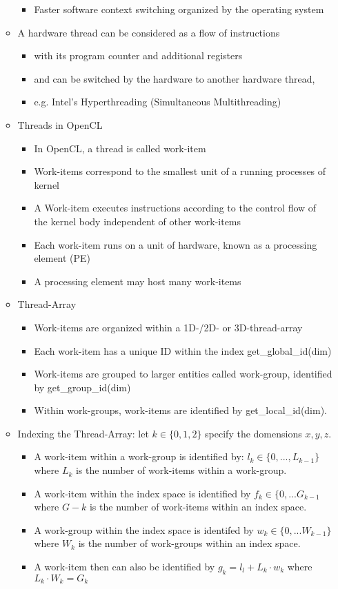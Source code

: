 \documentclass[paper=a4, fontsize=11pt]{scrartcl} %
\numberwithin{equation}{section} %
\numberwithin{figure}{section} %
\numberwithin{table}{section} %
\begin{document}
\begin{itemize}
\begin{itemize}
\begin{itemize}
      \item Faster software context switching organized by the operating system
    \end{itemize}
    \item A hardware thread can be considered as a flow of instructions
    \begin{itemize}
      \item with its program counter and additional registers
      \item and can be switched by the hardware to another hardware thread,
      \item e.g. Intel's Hyperthreading (Simultaneous Multithreading)
    \end{itemize}
    \item Threads in OpenCL
    \begin{itemize}
      \item In OpenCL, a thread is called work-item
      \item Work-items correspond to the smallest unit of a running processes of kernel
      \item A Work-item executes instructions according to the control flow of the kernel body independent of other work-items
      \item Each work-item runs on a unit of hardware, known as a processing element (PE)
      \item A processing element may host many work-items
    \end{itemize}
    \item Thread-Array
    \begin{itemize}
      \item Work-items are organized within a 1D-/2D- or 3D-thread-array
      \item Each work-item has a unique ID within the index get_global_id(dim)
      \item Work-items are grouped to larger entities called work-group, identified by get_group_id(dim)
      \item Within work-groups, work-items are identified by get_local_id(dim).
    \end{itemize}
    \item Indexing the Thread-Array: let $k \in \{0,1,2\}$ specify the domensions $x,y,z$.
    \begin{itemize}
      \item A work-item within a work-group is identified by: $l_k \in \{0,...,L_{k-1}\}$ where $L_k$ is the number of work-items within a work-group.
      \item A work-item within the index space is identified by $f_k \in \{0,...G_{k-1}$ where $G-k$ is the number of work-items within an index space.
      \item A work-group within the index space is identifed by $w_k \in \{0,...W_{k-1}\}$ where $W_k$ is the number of work-groups within an index space.
      \item A work-item then can also be identified by $g_k = l_l + L_k \cdot w_k$ where $L_k \cdot W_k = G_k$
    \end{itemize}
  \end{itemize}
\end{itemize}
\end{document}
